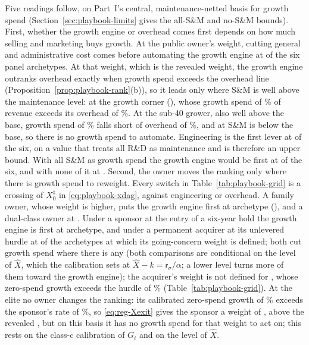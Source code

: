 Five readings follow, on Part~I's central, maintenance-netted basis for growth spend (Section~\ref{sec:playbook-limits} gives the all-S\&M and no-S\&M bounds). First, whether the growth engine or overhead comes first depends on how much selling and marketing buys growth. At the public owner's weight, cutting general and administrative cost comes before automating the growth engine at \pbNGAAheadGENet{} of the six panel archetypes. At that weight, which is the revealed weight, the growth engine outranks overhead exactly when growth spend exceeds the overhead line (Proposition~\ref{prop:playbook-rank}(b)), so it leads only where S\&M is well above the maintenance level: at the growth corner (\pbGEAheadNetList), whose growth spend of \pbAOneSigma\% of revenue exceeds its overhead of \pbAOneGA\%. At the sub-40 grower, also well above the base, growth spend of \pbAFourSigma\% falls short of overhead of \pbAFourGA\%, and at \pbSMNetZeroList{} S\&M is below the base, so there is no growth spend to automate. Engineering is the first lever at \pbNEngFirstRevNet{} of the six, on a value that treats all R\&D as maintenance and is therefore an upper bound. With all S\&M as growth spend the growth engine would be first at \pbNGEFirstRevAll{} of the six, and with none of it at \pbNGEFirstRevNone.
Second, the owner moves the ranking only where there is growth spend to reweight. Every switch in Table~\ref{tab:playbook-grid} is a crossing of $X^\ddagger_0$ in \eqref{eq:playbook-xdag}, against engineering or overhead. A family owner, whose weight is higher, puts the growth engine first at \pbNGEFirstFam{} archetype (\pbGEFirstFamList), and a dual-class owner at \pbNGEFirstHyb. Under a sponsor at the entry of a six-year hold the growth engine is first at \pbNGEFirstPE{} archetype, and under a permanent acquirer at its unlevered hurdle at \pbNGEFirstPC{} of the \pbNDefinedPC{} archetypes at which its going-concern weight is defined; both cut growth spend where there is any (both comparisons are conditional on the level of $\hat X$, which the calibration sets at $\hat X-k=\mathsf r_\sigma/\alpha$; a lower level turns more of them toward the growth engine); %
the acquirer's weight is not defined for \pbPCUndefined, whose zero-spend growth exceeds the hurdle of \pbPCRate\% (Table~\ref{tab:playbook-grid}). At the elite no owner changes the ranking: its calibrated zero-spend growth of \pbASixGi\% exceeds the sponsor's rate of \pbPERate\%, so \eqref{eq:reg-Xexit} gives the sponsor a weight of \pbASixXPE, above the revealed \pbASixXhat, but on this basis it has no growth spend for that weight to act on; this rests on the class-c calibration of $G_i$ and on the level of $\hat X$. %
